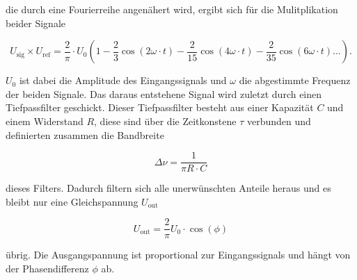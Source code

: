 die durch eine Fourierreihe angenähert wird, ergibt sich für die Mulitplikation beider Signale 

\begin{equation}
    U_\text{sig} \times U_\text{ref} = \frac{2}{\pi} \cdot U_0 \left(1 - \frac{2}{3}\cos{\left(2\omega \cdot t\right)}  -  \frac{2}{15}\cos{\left(4\omega \cdot t\right)} - \frac{2}{35}\cos{\left(6\omega \cdot t\right)}...\right).
    \label{eq:u_ref_sig}
\end{equation}

$U_0$ ist dabei die Amplitude des Eingangssignals und $\omega$ die abgestimmte Frequenz der beiden Signale.
Das daraus entstehene Signal wird zuletzt durch einen Tiefpassfilter geschickt.
Dieser Tiefpassfilter besteht aus einer Kapazität $C$ und einem Widerstand $R$, diese sind über die Zeitkonstene $\tau$ verbunden und definierten zusammen die Bandbreite

\begin{equation}
    \Delta \nu = \frac{1}{\pi R \cdot C}
    \label{eq:tau}
\end{equation}

dieses Filters.
Dadurch filtern sich alle unerwünschten Anteile heraus und es bleibt nur eine Gleichspannung $U_\text{out}$ 

\begin{equation}
    U_\text{out} = \frac{2}{\pi} U_0 \cdot \cos{\left(\phi\right)}
    \label{eq:u_out}
\end{equation}

übrig.
Die Ausgangspannung ist proportional zur Eingangssignals und hängt von der Phasendifferenz $\phi$ ab. 